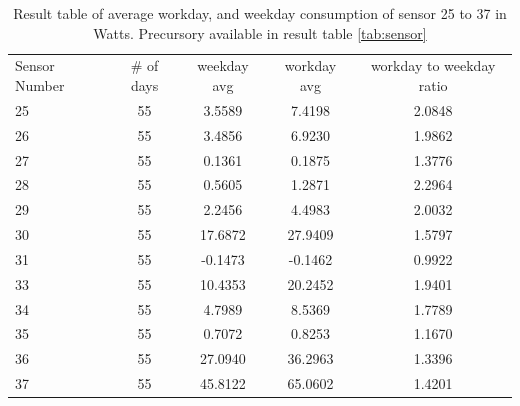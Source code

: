 \begin{table}[h]
	\centering
	\begin{tabular}{l|c|c|c|c}
		Sensor Number & \# of days & weekday avg & workday avg & workday to weekday ratio \\
		25 & 55 & 3.5589 & 7.4198 & 2.0848 \\
		26 & 55 & 3.4856 & 6.9230 & 1.9862 \\
		27 & 55 & 0.1361 & 0.1875 & 1.3776 \\
		28 & 55 & 0.5605 & 1.2871 & 2.2964 \\
		29 & 55 & 2.2456 & 4.4983 & 2.0032 \\
		30 & 55 & 17.6872 & 27.9409 & 1.5797 \\
		31 & 55 & -0.1473 & -0.1462 & 0.9922 \\
		33 & 55 & 10.4353 & 20.2452 & 1.9401 \\
		34 & 55 & 4.7989 & 8.5369 & 1.7789 \\
		35 & 55 & 0.7072 & 0.8253 & 1.1670 \\
		36 & 55 & 27.0940 & 36.2963 & 1.3396 \\
		37 & 55 & 45.8122 & 65.0602 & 1.4201 \\
	\end{tabular}
	\caption{Result table of average \gls{workday}, and weekday consumption of sensor 25 to 37 in Watts. Precursory available in result table \ref{tab:sensor}}
	\label{tab:sensor_cont}
\end{table}
